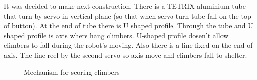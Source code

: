 \begin{enumerate*}
    \item It was decided to make next construction. There is a TETRIX aluminium tube that turn by servo in vertical plane (so that when servo turn tube fall on the top of button). At the end of tube there is U shaped profile. Through the tube and U shaped profile is axis where hang climbers. U-shaped profile dosen't allow climbers to fall during the robot's moving. Also there is a line fixed on the end of axis. The line reel by the second servo so axis move and climbers fall to shelter.
    \begin{figure}[h]
    	\begin{minipage}[h]{1\linewidth}
    		\caption{Mechanism for scoring climbers}
    	\end{minipage}
    \end{figure}
  
  \end{enumerate*}	
  
  
  